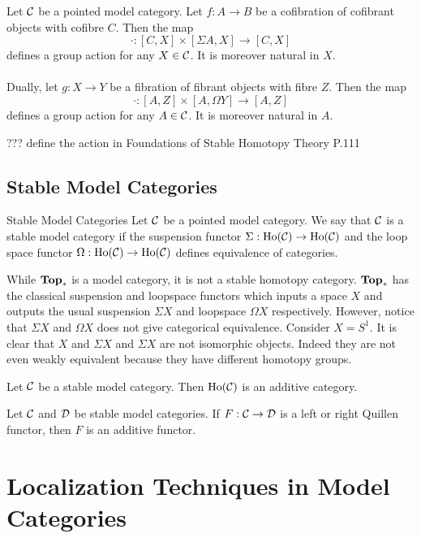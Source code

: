 \documentclass[a4paper]{article}
\begin{document}
\begin{thm}{}{} Let $\mathcal{C}$ be a pointed model category. Let $f:A\to B$ be a cofibration of cofibrant objects with cofibre $C$. Then the map $$\cdot:[C,X]\times[\Sigma A,X]\to[C,X]$$ defines a group action for any $X\in\mathcal{C}$. It is moreover natural in $X$. \\~\\

Dually, let $g:X\to Y$ be a fibration of fibrant objects with fibre $Z$. Then the map $$\cdot:[A,Z]\times[A,\Omega Y]\to[A,Z]$$ defines a group action for any $A\in\mathcal{C}$. It is moreover natural in $A$. 
\end{thm}

??? define the action in Foundations of Stable Homotopy Theory P.111

\subsection{Stable Model Categories}
\begin{defn}{Stable Model Categories}{} Let $\mathcal{C}$ be a pointed model category. We say that $\mathcal{C}$ is a stable model category if the suspension functor $\Sigma:\text{Ho}(\mathcal{C})\to\text{Ho}(\mathcal{C})$ and the loop space functor $\Omega:\text{Ho}(\mathcal{C})\to\text{Ho}(\mathcal{C})$ defines equivalence of categories. 
\end{defn}

While $\bold{Top}_\ast$ is a model category, it is not a stable homotopy category. $\bold{Top}_\ast$ has the classical suspension and loopspace functors which inputs a space $X$ and outputs the usual suspension $\Sigma X$ and loopspace $\Omega X$ respectively. However, notice that $\Sigma X$ and $\Omega X$ does not give categorical equivalence. Consider $X=S^1$. It is clear that $X$ and $\Sigma X$ and $\Sigma X$ are not isomorphic objects. Indeed they are not even weakly equivalent because they have different homotopy groups. 

\begin{thm}{}{} Let $\mathcal{C}$ be a stable model category. Then $\text{Ho}(\mathcal{C})$ is an additive category. 
\end{thm}

\begin{thm}{}{} Let $\mathcal{C}$ and $\mathcal{D}$ be stable model categories. If $F:\mathcal{C}\to\mathcal{D}$ is a left or right Quillen functor, then $F$ is an additive functor. 
\end{thm}

\pagebreak
\section{Localization Techniques in Model Categories}
\end{document}
